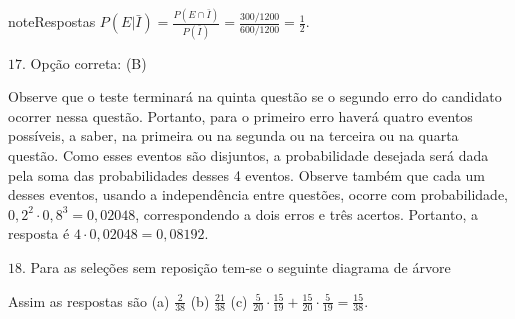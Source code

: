 \begin{sphinxadmonition}{note}{Respostas}
\(P(E|\bar{I})=\frac{P(E\cap \bar{I})}{P(\bar{I})}=\frac{300/1200}{600/1200}=\frac{1}{2}.\)

\(17.\) Opção correta: (B)

Observe que o teste terminará na quinta questão se o segundo erro do candidato ocorrer nessa questão. Portanto, para o primeiro erro haverá quatro eventos possíveis, a saber, na primeira ou na segunda ou na terceira ou na quarta questão. Como esses eventos são disjuntos, a probabilidade desejada será dada pela soma das probabilidades desses 4 eventos. Observe também que cada um desses eventos, usando a independência entre questões, ocorre com probabilidade, \(0,2^2\cdot 0,8^3=0,02048\), correspondendo a dois erros e três acertos. Portanto, a resposta é \(4\cdot 0,02048=0,08192\).

\(18.\) Para as seleções sem reposição tem-se o seguinte diagrama de árvore
\begin{center}\end{center}
Assim as respostas são (a) \(\frac{2}{38}\) (b) \(\frac{21}{38}\)  (c) \(\frac{5}{20}\cdot\frac{15}{19}+\frac{15}{20}\cdot\frac{5}{19}=\frac{15}{38}\).


\end{sphinxadmonition}
